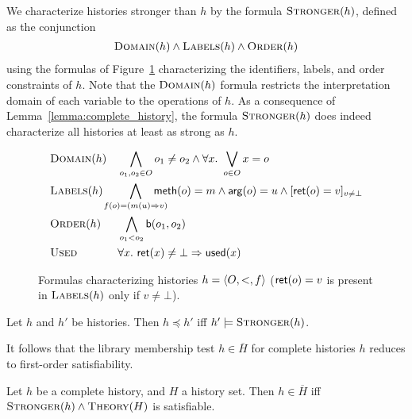We characterize histories stronger than $h$ by the formula
$\textsc{Stronger}(h)$, defined as the conjunction
\begin{align*}
  \textsc{Domain}(h) \land \textsc{Labels}(h) \land \textsc{Order}(h)
\end{align*}
using the formulas of Figure~\ref{fig:formula:history} characterizing the
identifiers, labels, and order constraints of $h$. Note that the
$\textsc{Domain}(h)$ formula restricts the interpretation domain of each
variable to the operations of $h$. As a consequence of
Lemma~\ref{lemma:complete_history}, the formula $\textsc{Stronger}(h)$ does
indeed characterize all histories at least as strong as $h$.

\begin{figure}

  \footnotesize
  \begin{align*}
    & \textsc{Domain}(h)
    && \bigwedge_{o_1, o_2 \in O} o_1 \neq o_2 \land \forall x.\ \bigvee_{o\in O} x = o \\
    & \textsc{Labels}(h)
    && \hspace{-5mm} \bigwedge_{f(o) = (m(u) \Rightarrow v)}
      \hspace{-5mm}
      {\sf meth}(o) = m \land {\sf arg}(o) = u \land 
      [{\sf ret}(o) = v]_{v \neq \bot} \\
    & \textsc{Order}(h)
    && \bigwedge_{o_1 < o_2} {\sf b}(o_1, o_2) \\
    & \textsc{Used} 
    && \forall x.\ {\sf ret}(x) \neq \bot \implies {\sf used}(x)
  \end{align*}

  \caption{Formulas characterizing histories $h = {\langle{O,<,f}\rangle}$ (${\sf ret}(o) = v$
  is present in $\textsc{Labels}(h)$ only if $v\neq \bot$).}
  \label{fig:formula:history}

\end{figure}

\begin{lemma}
  \label{lem:stronger_form_complete}
  
  Let $h$ and $h'$ be histories.
  Then $h \preceq h'$ if{f} $h' \models \textsc{Stronger}(h)$.

\end{lemma}

\noindent
It follows that the library membership test $h \in \overline{H}$ for complete
histories $h$ reduces to first-order satisfiability.

\begin{theorem}
  \label{th:satisfiability_pending}

  Let $h$ be a complete history, and $H$ a history set.
  Then $h \in \overline{H}$ if{f}
  $\textsc{Stronger}(h) \land \textsc{Theory}(H)$ is satisfiable.

\end{theorem}

